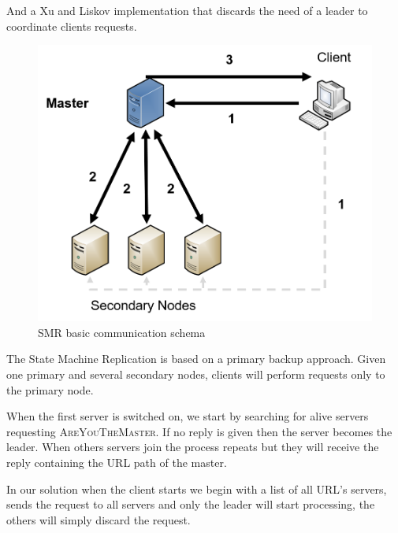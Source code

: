 \documentclass[times, 10pt,twocolumn]{article}
\begin{document}
And a Xu and Liskov implementation that discards the need of a leader to
coordinate clients requests.



\begin{figure}
   \includegraphics[width=\linewidth]{smr_basic.png}
   \caption{SMR basic communication schema}
   \label{fig:smr_basic}
 \end{figure}


The State Machine Replication is based on a primary backup approach. Given one
primary and several secondary nodes, clients will perform requests only to the
primary node.

When the first server is switched on, we start by searching for alive servers
requesting \textsc{AreYouTheMaster}. If no reply is given then the server
becomes the leader. When others servers join the process repeats but they
will receive the reply containing the URL path of the master.


In our solution when the client starts we begin with a list of all URL's servers,
sends the request to all servers and only the leader will start processing, the others
will simply discard the request.

\end{document}
